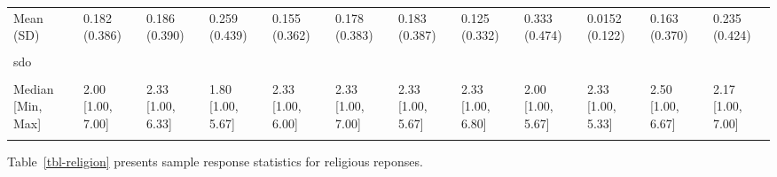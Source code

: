 \documentclass[
  single column]{article}
\begin{document}
\begin{landscape}
\begin{longtable}[t]{llllllllllll}
\addlinespace
Mean (SD) & 0.182 (0.386) & 0.186 (0.390) & 0.259 (0.439) & 0.155 (0.362) & 0.178 (0.383) & 0.183 (0.387) & 0.125 (0.332) & 0.333 (0.474) & 0.0152 (0.122) & 0.163 (0.370) & 0.235 (0.424)\\
\cellcolor{gray!10}{Median [Min, Max]} & \cellcolor{gray!10}{0 [0, 1.00]} & \cellcolor{gray!10}{0 [0, 1.00]} & \cellcolor{gray!10}{0 [0, 1.00]} & \cellcolor{gray!10}{0 [0, 1.00]} & \cellcolor{gray!10}{0 [0, 1.00]} & \cellcolor{gray!10}{0 [0, 1.00]} & \cellcolor{gray!10}{0 [0, 1.00]} & \cellcolor{gray!10}{0 [0, 1.00]} & \cellcolor{gray!10}{0 [0, 1.00]} & \cellcolor{gray!10}{0 [0, 1.00]} & \cellcolor{gray!10}{0 [0, 1.00]}\\
sdo &  &  &  &  &  &  &  &  &  &  & \\
\cellcolor{gray!10}{Mean (SD)} & \cellcolor{gray!10}{2.16 (0.963)} & \cellcolor{gray!10}{2.47 (0.986)} & \cellcolor{gray!10}{1.99 (0.960)} & \cellcolor{gray!10}{2.38 (0.969)} & \cellcolor{gray!10}{2.37 (0.966)} & \cellcolor{gray!10}{2.41 (0.943)} & \cellcolor{gray!10}{2.45 (1.03)} & \cellcolor{gray!10}{2.30 (1.15)} & \cellcolor{gray!10}{2.44 (0.896)} & \cellcolor{gray!10}{2.52 (0.987)} & \cellcolor{gray!10}{2.26 (1.02)}\\
Median [Min, Max] & 2.00 [1.00, 7.00] & 2.33 [1.00, 6.33] & 1.80 [1.00, 5.67] & 2.33 [1.00, 6.00] & 2.33 [1.00, 7.00] & 2.33 [1.00, 5.67] & 2.33 [1.00, 6.80] & 2.00 [1.00, 5.67] & 2.33 [1.00, 5.33] & 2.50 [1.00, 6.67] & 2.17 [1.00, 7.00]\\
\addlinespace
\cellcolor{gray!10}{Missing} & \cellcolor{gray!10}{1 (0.0\%)} & \cellcolor{gray!10}{2 (0.1\%)} & \cellcolor{gray!10}{0 (0\%)} & \cellcolor{gray!10}{2 (0.1\%)} & \cellcolor{gray!10}{6 (0.2\%)} & \cellcolor{gray!10}{1 (0.1\%)} & \cellcolor{gray!10}{1 (0.7\%)} & \cellcolor{gray!10}{0 (0\%)} & \cellcolor{gray!10}{0 (0\%)} & \cellcolor{gray!10}{1 (0.2\%)} & \cellcolor{gray!10}{1 (0.1\%)}\\*

\end{longtable}

\endgroup{}


\end{landscape}

\newpage{}

Table~\ref{tbl-religion} presents sample response statistics for
religious reponses.
\end{document}
